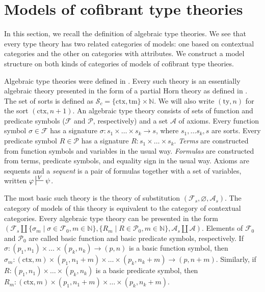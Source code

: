 \documentclass[reqno]{amsart}
\theoremstyle{definition}
\theoremstyle{remark}
\newcommand{\fs}[1]{\mathrm{#1}}
\numberwithin{figure}{section}
\begin{document}
\section{Models of cofibrant type theories}

In this section, we recall the definition of algebraic type theories.
We see that every type theory has two related categories of models: one based on contextual categories and the other on categories with attributes.
We construct a model structure on both kinds of categories of models of cofibrant type theories.

Algebraic type theories were defined in \cite{alg-tt}.
Every such theory is an essentially algebraic theory presented in the form of a partial Horn theory as defined in \cite{PHL}.
The set of sorts is defined as $\mathcal{S}_c = \{ \fs{ctx}, \fs{tm} \} \times \mathbb{N}$.
We will also write $(\fs{ty},n)$ for the sort $(\fs{ctx},n+1)$.
An algebraic type theory consists of sets of function and predicate symbols ($\mathcal{F}$ and $\mathcal{P}$, respectively) and a set $\mathcal{A}$ of axioms.
Every function symbol $\sigma \in \mathcal{F}$ has a signature $\sigma : s_1 \times \ldots \times s_k \to s$, where $s_1, \ldots s_k, s$ are sorts.
Every predicate symbol $R \in \mathcal{P}$ has a signature $R : s_1 \times \ldots \times s_k$.
\emph{Terms} are constructed from function symbols and variables in the usual way.
\emph{Formulas} are constructed from terms, predicate symbols, and equality sign in the usual way.
Axioms are sequents and a \emph{sequent} is a pair of formulas together with a set of variables, written $\varphi \sststile{}{V} \psi$.

The most basic such theory is the theory of substitution $(\mathcal{F}_s, \varnothing, \mathcal{A}_s)$.
The category of models of this theory is equivalent to the category of contextual categories.
Every algebraic type theory can be presented in the form $(\mathcal{F}_s \amalg \{ \sigma_m \mid \sigma \in \mathcal{F}_0, m \in \mathbb{N} \}, \{ R_m \mid R \in \mathcal{P}_0, m \in \mathbb{N} \}, \mathcal{A}_s \amalg \mathcal{A})$.
Elements of $\mathcal{F}_0$ and $\mathcal{P}_0$ are called basic function and basic predicate symbols, respectively.
If $\sigma : (p_1,n_1) \times \ldots \times (p_k,n_k) \to (p,n)$ is a basic function symbol, then $\sigma_m : (\fs{ctx},m) \times (p_1,n_1+m) \times \ldots \times (p_k,n_k+m) \to (p,n+m)$.
Similarly, if $R : (p_1,n_1) \times \ldots \times (p_k,n_k)$ is a basic predicate symbol, then $R_m : (\fs{ctx},m) \times (p_1,n_1+m) \times \ldots \times (p_k,n_k+m)$.
\end{document}

